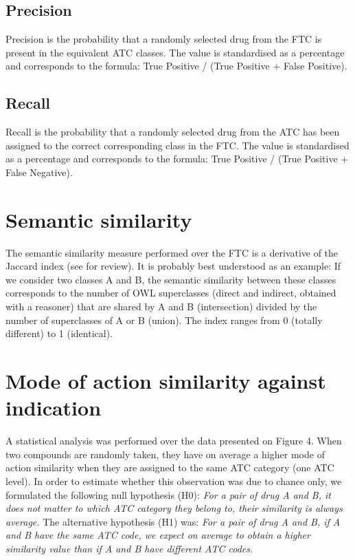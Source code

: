 \documentclass{bioinfo}
\begin{document}
\subsection{Precision}
Precision is the probability that a randomly selected drug from the FTC is present in the equivalent ATC classes. 
The value is standardised as a percentage and corresponds to the formula: True Positive / (True Positive + False Positive).

\subsection{Recall}
Recall is the probability that a randomly selected drug from the ATC has been assigned to the correct 
corresponding class in the FTC. The value is standardised as a percentage and corresponds 
to the formula: True Positive / (True Positive + False Negative).

\section{Semantic similarity}
The semantic similarity measure performed over the FTC is a derivative of the 
Jaccard index \citep{jaccard1912distribution} \citep{rogers1960computer} (see \cite{pesquita2009semantic} for review). 
It is probably best understood as an example: If we consider two classes A and B, the semantic similarity 
between these classes corresponds to the number of OWL superclasses (direct and indirect, obtained with a reasoner) that 
are shared by A and B (intersection) divided by the number of superclasses of A or B (union). The index ranges 
from 0 (totally different) to 1 (identical).

\section{Mode of action similarity against indication}
A statistical analysis was performed over the data presented on Figure 4. 
When two compounds are randomly taken, they have on average a higher mode of action similarity when 
they are assigned to the same ATC category (one ATC level).
In order to estimate whether this observation was 
due to chance only, we formulated the following null hypothesis (H0): \emph{For a pair of drug A and B, it does not 
matter to which ATC category they belong to, their similarity is always average.}
The alternative hypothesis (H1) was: \emph{For a pair of drug A and B, if A and B have the same ATC code, 
we expect on average to obtain a higher similarity value than if A and B have different ATC codes.}
\end{document}
